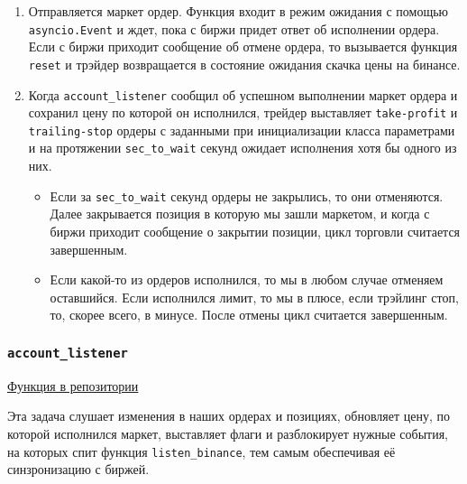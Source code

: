 \begin{enumerate}
    \item Отправляется маркет ордер. Функция входит в режим ожидания с помощью \texttt{asyncio.Event} и ждет, пока с биржи придет ответ об исполнении ордера. Если с биржи приходит сообщение об отмене ордера, то вызывается функция \texttt{reset} и трэйдер возвращается в состояние ожидания скачка цены на бинансе.
    \item Когда \texttt{account\_listener} сообщил об успешном выполнении маркет ордера и сохранил цену по которой он исполнился, трейдер выставляет \texttt{take-profit} и \texttt{trailing-stop} ордеры с заданными при инициализации класса параметрами и на протяжении \texttt{sec\_to\_wait} секунд ожидает исполнения хотя бы одного из них.
    \begin{itemize}
        \item Если за \texttt{sec\_to\_wait} секунд ордеры не закрылись, то они отменяются. Далее закрывается позиция в которую мы зашли маркетом, и когда с биржи приходит сообщение о закрытии позиции, цикл торговли считается завершенным.
        \item Если какой-то из ордеров исполнился, то мы в любом случае отменяем оставшийся. Если исполнился лимит, то мы в плюсе, если трэйлинг стоп, то, скорее всего, в минусе. После отмены цикл считается завершенным.
    \end{itemize}
    
\end{enumerate}


\subsubsection{\texttt{account\_listener}}

\href{https://github.com/dexety/dex-trading-system/blob/main/research/ib-0002-cross-analysis/trader.py#L365}{Функция в репозитории}

Эта задача слушает изменения в наших ордерах и позициях, обновляет цену, по которой исполнился маркет, выставляет флаги и разблокирует нужные события, на которых спит функция \texttt{listen\_binance}, тем самым обеспечивая её синзронизацию с биржей.
